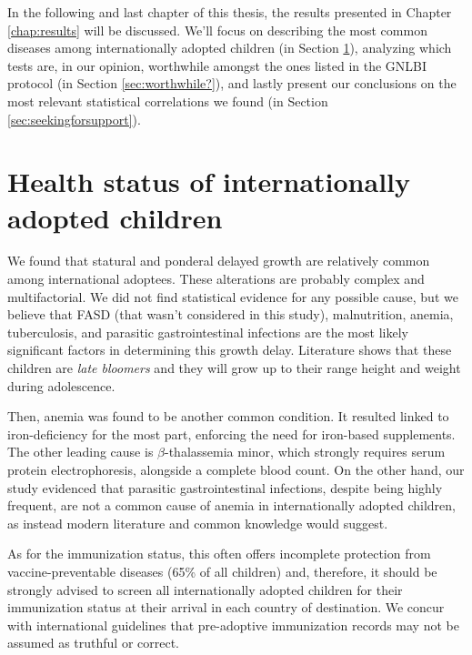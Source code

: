 

\label{chap:discussion}
In the following and last chapter of this thesis, the results presented in Chapter \ref{chap:results} will be discussed. We'll focus on describing the most common diseases among internationally adopted children (in Section \ref{sec:healthstatusofIAC}), analyzing which tests are, in our opinion, worthwhile amongst the ones listed in the GNLBI protocol (in Section \ref{sec:worthwhile?}), and lastly present our conclusions on the most relevant statistical correlations we found (in Section \ref{sec:seekingforsupport}). 

\section{Health status of internationally adopted children}\label{sec:healthstatusofIAC}
We found that statural and ponderal delayed growth are relatively common among international adoptees. These alterations are probably complex and multifactorial. We did not find statistical evidence for any possible cause, but we believe that FASD (that wasn't considered in this study), malnutrition, anemia, tuberculosis, and parasitic gastrointestinal infections are the most likely significant factors in determining this growth delay. Literature shows that these children are \textit{late bloomers} and they will grow up to their range height and weight during adolescence.

Then, anemia was found to be another common condition. It resulted linked to iron-deficiency for the most part, enforcing the need for iron-based supplements. The other leading cause is $\beta$-thalassemia minor, which strongly requires serum protein electrophoresis, alongside a complete blood count. On the other hand, our study evidenced that parasitic gastrointestinal infections, despite being highly frequent, are not a common cause of anemia in internationally adopted children, as instead modern literature and common knowledge would suggest.

As for the immunization status, this often offers incomplete protection from vaccine-preventable diseases (65\% of all children) and, therefore, it should be strongly advised to screen all internationally adopted children for their immunization status at their arrival in each country of destination. We concur with international guidelines that pre-adoptive immunization records may not be assumed as truthful or correct.

